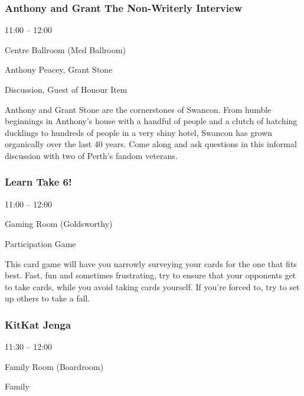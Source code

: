 \documentclass{scrreprt}
\begin{document}
\begin{multicols}{2}
\subsubsection*{Anthony and Grant The Non-Writerly Interview}\begin{description}
\setlength{\itemsep}{0pt}
\setlength{\parsep}{0pt}
\setlength{\parskip}{0pt}
\item[Time:]{11:00 -- 12:00}
\item[Venue:]{Centre Ballroom (Med Ballroom)}
\item[People:]{Anthony Peacey, Grant Stone}
\item[Tags:]{Discussion, Guest of Honour Item}\end{description}
Anthony and Grant Stone are the cornerstones of Swancon. From humble beginnings in Anthony's house with a handful of people and a clutch of hatching ducklings to hundreds of people in a very shiny hotel, Swancon has grown organically over the last 40 years. Come along and ask questions in this informal discussion with two of Perth's fandom veterans.
\subsubsection*{Learn Take 6!}\begin{description}
\setlength{\itemsep}{0pt}
\setlength{\parsep}{0pt}
\setlength{\parskip}{0pt}
\item[Time:]{11:00 -- 12:00}
\item[Venue:]{Gaming Room (Goldsworthy)}
\item[Tags:]{Participation Game}\end{description}
This card game will have you narrowly surveying your cards for the one that fits best. Fast, fun and sometimes frustrating, try to ensure that your opponents get to take cards, while you avoid taking cards yourself. If you're forced to, try to set up others to take a fall.
\subsubsection*{KitKat Jenga}\begin{description}
\setlength{\itemsep}{0pt}
\setlength{\parsep}{0pt}
\setlength{\parskip}{0pt}
\item[Time:]{11:30 -- 12:00}
\item[Venue:]{Family Room (Boardroom)}
\item[Tags:]{Family}\end{description}


\end{multicols}
\end{document}
